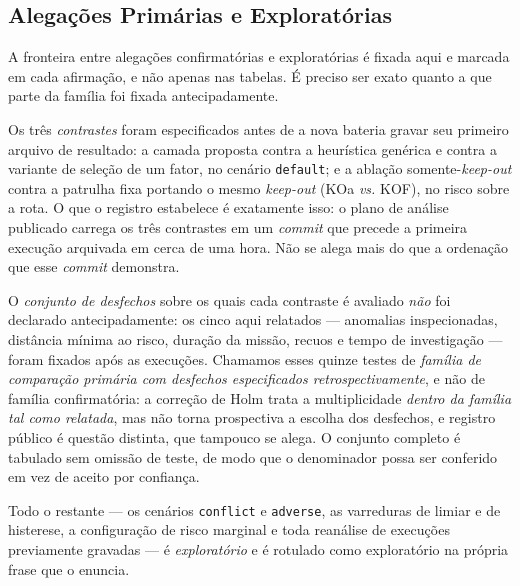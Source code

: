 \subsection{Alegações Primárias e Exploratórias}
\label{sec:res-familias}

A fronteira entre alegações confirmatórias e exploratórias é fixada aqui e marcada
em cada afirmação, e não apenas nas tabelas. É preciso ser exato quanto a que parte
da família foi fixada antecipadamente.

Os três \emph{contrastes} foram especificados antes de a nova bateria gravar seu
primeiro arquivo de resultado: a camada proposta contra a heurística genérica e
contra a variante de seleção de um fator, no cenário \texttt{default}; e a ablação
somente-\textit{keep-out} contra a patrulha fixa portando o mesmo \textit{keep-out}
(KOa \textit{vs.} KOF), no risco sobre a rota. O que o registro estabelece é
exatamente isso: o plano de análise publicado carrega os três contrastes em um
\textit{commit} que precede a primeira execução arquivada em cerca de uma hora. Não
se alega mais do que a ordenação que esse \textit{commit} demonstra.

O \emph{conjunto de desfechos} sobre os quais cada contraste é avaliado \emph{não}
foi declarado antecipadamente: os cinco aqui relatados --- anomalias inspecionadas,
distância mínima ao risco, duração da missão, recuos e tempo de investigação ---
foram fixados após as execuções. Chamamos esses quinze testes de \emph{família de
comparação primária com desfechos especificados retrospectivamente}, e não de
família confirmatória: a correção de Holm trata a multiplicidade \emph{dentro da
família tal como relatada}, mas não torna prospectiva a escolha dos desfechos, e
registro público é questão distinta, que tampouco se alega. O conjunto completo é
tabulado sem omissão de teste, de modo que o denominador possa ser conferido em vez
de aceito por confiança.

Todo o restante --- os cenários \texttt{conflict} e \texttt{adverse}, as varreduras
de limiar e de histerese, a configuração de risco marginal e toda reanálise de
execuções previamente gravadas --- é \emph{exploratório} e é rotulado como
exploratório na própria frase que o enuncia.

